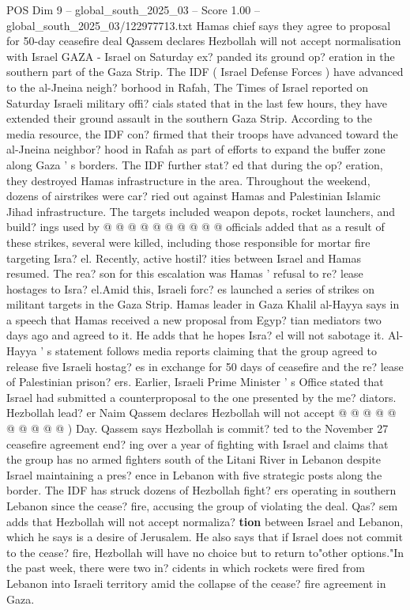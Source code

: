 \begin{textsample}{POS Dim 9 – global\_south\_2025\_03 – Score 1.00 – global\_south\_2025\_03/122977713.txt}  \label{ex:f9_pos_138}
Hamas chief says they agree to proposal for 50-day ceasefire deal Qassem declares Hezbollah will not accept normalisation with Israel GAZA - Israel on Saturday ex? panded its ground op? eration in the southern part of the Gaza Strip.
The IDF ( Israel Defense Forces ) have advanced to the al-Jneina neigh? borhood in Rafah, The Times of Israel reported on Saturday Israeli military offi? cials stated that in the last few hours, they have extended their ground assault in the southern Gaza Strip.
According to the media resource, the IDF con? firmed that their troops have advanced toward the al-Jneina neighbor? hood in Rafah as part of efforts to expand the buffer zone along Gaza ' s borders.
The IDF further stat? ed that during the op? eration, they destroyed Hamas infrastructure in the area.
Throughout the weekend, dozens of airstrikes were car? ried out against Hamas and Palestinian Islamic Jihad infrastructure.
The targets included weapon depots, rocket launchers, and build? ings used by @ @ @ @ @ @ @ @ @ @ officials added that as a result of these strikes, several were killed, including those responsible for mortar fire targeting Isra? el.
Recently, active hostil? ities between Israel and Hamas resumed.
The rea? son for this escalation was Hamas ' refusal to re? lease hostages to Isra? el.Amid this, Israeli forc? es launched a series of strikes on militant targets in the Gaza Strip.
Hamas leader in Gaza Khalil al-Hayya says in a speech that Hamas received a new proposal from Egyp? tian mediators two days ago and agreed to it.
He adds that he hopes Isra? el will not sabotage it.
Al-Hayya ' s statement follows media reports claiming that the group agreed to release five Israeli hostag? es in exchange for 50 days of ceasefire and the re? lease of Palestinian prison? ers.
Earlier, Israeli Prime Minister ' s Office stated that Israel had submitted a counterproposal to the one presented by the me? diators.
Hezbollah lead? er Naim Qassem declares Hezbollah will not accept @ @ @ @ @ @ @ @ @ @ ) Day.
Qassem says Hezbollah is commit? ted to the November 27 ceasefire agreement end? ing over a year of fighting with Israel and claims that the group has no armed fighters south of the Litani River in Lebanon despite Israel maintaining a pres? ence in Lebanon with five strategic posts along the border.
The IDF has struck dozens of Hezbollah fight? ers operating in southern Lebanon since the cease? fire, accusing the group of violating the deal.
Qas? sem adds that Hezbollah will not accept normaliza? \textbf{tion} between Israel and Lebanon, which he says is a desire of Jerusalem.
He also says that if Israel does not commit to the cease? fire, Hezbollah will have no choice but to return to"other options."In the past week, there were two in? cidents in which rockets were fired from Lebanon into Israeli territory amid the collapse of the cease? fire agreement in Gaza.

\end{textsample}
